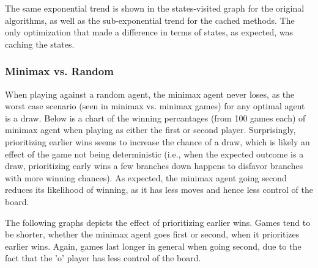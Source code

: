 \documentclass[12pt]{article}
\begin{document}
The same exponential trend is shown in the states-visited graph for the original algorithms, as well as the sub-exponential trend for the cached methods. The only optimization that made a difference in terms of states, as expected, was caching the states.

\subsubsection*{Minimax vs. Random}

When playing against a random agent, the minimax agent never loses, as the worst case scenario (seen in minimax vs. minimax games) for any optimal agent is a draw. Below is a chart of the winning percantages (from 100 games each) of minimax agent when playing as either the first or second player. Surprisingly, prioritizing earlier wins seems to increase the chance of a draw, which is likely an effect of the game not being deterministic (i.e., when the expected outcome is a draw, prioritizing early wins a few branches down happens to disfavor branches with more winning chances). As expected, the minimax agent going second reduces its likelihood of winning, as it has less moves and hence less control of the board.
\begin{center}
\end{center}

The following graphs depicts the effect of prioritizing earlier wins. Games tend to be shorter, whether the minimax agent goes first or second, when it prioritizes earlier wins. Again, games last longer in general when going second, due to the fact that the 'o' player has less control of the board.
\end{document}
